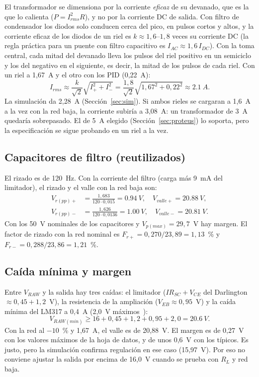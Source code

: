 \documentclass[conference]{IEEEtran}
\begin{document}
El transformador se dimensiona por la corriente \emph{eficaz} de su devanado, que es la que lo calienta ($P=I_{rms}^2R$), y no por la corriente DC de salida. Con filtro de condensador los diodos solo conducen cerca del pico, en pulsos cortos y altos, y la corriente eficaz de los diodos de un riel es $k\approx1{,}6$--$1{,}8$ veces su corriente DC (la regla práctica para un puente con filtro capacitivo es $I_{AC}\approx1{,}6\,I_{DC}$). Con la toma central, cada mitad del devanado lleva los pulsos del riel positivo en un semiciclo y los del negativo en el siguiente, es decir, la mitad de los pulsos de cada riel. Con un riel a 1,67~A y el otro con los PID (0,22~A):
\begin{equation}
I_{rms}\approx\frac{k}{\sqrt{2}}\sqrt{I_+^2+I_-^2}=\frac{1{,}8}{\sqrt2}\sqrt{1{,}67^2+0{,}22^2}\approx\SI{2,1}{A}.
\end{equation}
La simulación da 2,28~A (Sección~\ref{sec:sim}). Si ambos rieles se cargaran a 1,6~A a la vez con la red baja, la corriente subiría a 3,08~A: un transformador de 3~A quedaría sobrepasado. El de 5~A elegido (Sección~\ref{sec:proteus}) lo soporta, pero la especificación se sigue probando en un riel a la vez.

\subsection{Capacitores de filtro (reutilizados)}
El rizado es de 120~Hz. Con la corriente del filtro (carga más 9~mA del limitador), el rizado y el valle con la red baja son:
\begin{align}
V_{r(pp)+}&=\frac{1{,}683}{120\cdot0{,}015}=\SI{0,94}{V},\quad V_{valle+}=\SI{20,88}{V},\\
V_{r(pp)-}&=\frac{1{,}626}{120\cdot0{,}0136}=\SI{1,00}{V},\quad V_{valle-}=\SI{20,81}{V}.
\end{align}
Con los 50~V nominales de los capacitores y $V_{p(max)}=29{,}7$~V hay margen. El factor de rizado con la red nominal es $F_{r+}=0{,}270/23{,}89=1{,}13$~\% y $F_{r-}=0{,}288/23{,}86=1{,}21$~\%.

\subsection{Caída mínima y margen}
Entre $V_{RAW}$ y la salida hay tres caídas: el limitador ($I R_{SC}+V_{CE}$ del Darlington $\approx0{,}45+1{,}2$~V), la resistencia de la ampliación ($V_{EB}\approx0{,}95$~V) y la caída mínima del LM317 a 0,4~A (2,0~V máximos~\cite{lm317}):
\begin{equation}
V_{RAW(min)}\geq16+0{,}45+1{,}2+0{,}95+2{,}0=\SI{20,6}{V}.
\end{equation}
Con la red al $-10$~\% y 1,67~A, el valle es de 20,88~V. El margen es de 0,27~V con los valores máximos de la hoja de datos, y de unos 0,6~V con los típicos. Es justo, pero la simulación confirma regulación en ese caso (15,97~V). Por eso no conviene ajustar la salida por encima de 16,0~V cuando se prueba con $R_L$ y red baja.
\end{document}
